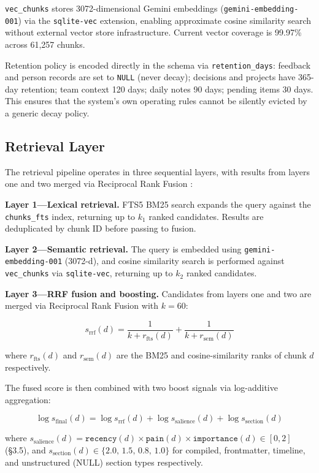 \texttt{vec\_chunks} stores 3072-dimensional Gemini embeddings
(\texttt{gemini-embedding-001}) via the \texttt{sqlite-vec} extension, enabling
approximate cosine similarity search without external vector store infrastructure. Current
vector coverage is 99.97\% across 61,257 chunks.

Retention policy is encoded directly in the schema via \texttt{retention\_days}: feedback
and person records are set to \texttt{NULL} (never decay); decisions and projects have
365-day retention; team context 120 days; daily notes 90 days; pending items 30 days. This
ensures that the system's own operating rules cannot be silently evicted by a generic decay
policy.

\subsection{Retrieval Layer}

The retrieval pipeline operates in three sequential layers, with results from layers one and
two merged via Reciprocal Rank Fusion \cite{cormack2009rrf}:

\textbf{Layer 1---Lexical retrieval.} FTS5 BM25 search expands the query against the
\texttt{chunks\_fts} index, returning up to $k_1$ ranked candidates. Results are
deduplicated by chunk ID before passing to fusion.

\textbf{Layer 2---Semantic retrieval.} The query is embedded using
\texttt{gemini-embedding-001} (3072-d), and cosine similarity search is performed against
\texttt{vec\_chunks} via \texttt{sqlite-vec}, returning up to $k_2$ ranked candidates.

\textbf{Layer 3---RRF fusion and boosting.} Candidates from layers one and two are merged
via Reciprocal Rank Fusion \cite{cormack2009rrf} with $k=60$:

\[
  s_{\text{rrf}}(d) = \frac{1}{k + r_{\text{fts}}(d)} + \frac{1}{k + r_{\text{sem}}(d)}
\]

where $r_{\text{fts}}(d)$ and $r_{\text{sem}}(d)$ are the BM25 and cosine-similarity ranks
of chunk $d$ respectively.

The fused score is then combined with two boost signals via log-additive aggregation:

\[
  \log s_{\text{final}}(d) = \log s_{\text{rrf}}(d) + \log s_{\text{salience}}(d)
    + \log s_{\text{section}}(d)
\]

where $s_{\text{salience}}(d) = \texttt{recency}(d) \times \texttt{pain}(d) \times
\texttt{importance}(d) \in [0, 2]$ (\S3.5), and $s_{\text{section}}(d) \in
\{2.0,\,1.5,\,0.8,\,1.0\}$ for compiled, frontmatter, timeline, and unstructured (NULL)
section types respectively.

